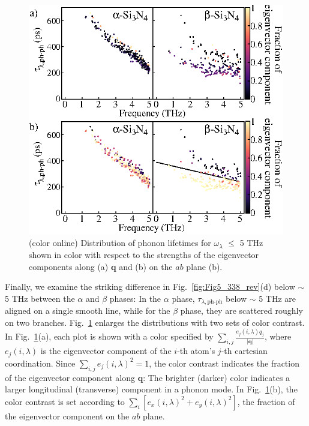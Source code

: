 \documentclass[twocolumn,amsmath,amssymb,a4paper,prb,superscriptaddress,floatfix]{revtex4-1}
\begin{document}
\begin{figure}[ht]
	 \centering
	   \includegraphics[width=\linewidth]{figure_analyze_gamma3_m1010_nolog_gray.eps} \caption{(color
		   	  online) Distribution of phonon lifetimes for $\omega_\lambda$ $\leq$ 5 THz
	  		  shown in color with respect to the strengths of the eigenvector
	  		  components along (a) $\mathbf q$ 
		  	  and (b) on the $ab$ plane (b).} \label{fig:Fig7_338} 
	   \centering
\end{figure}

Finally, we examine the striking difference in Fig.~\ref{fig:Fig5_338_rev}(d)
below $\sim$ 5 THz between the $\alpha$ and $\beta$ phases: In the $\alpha$
phase, $\tau_{\lambda,\text{ph-ph}}$ below $\sim$ 5 THz are aligned on a single
smooth line, while for the $\beta$ phase, they are scattered roughly on two
branches.  Fig.~\ref{fig:Fig7_338} enlarges the distributions with two sets of
color contrast.  In Fig.~\ref{fig:Fig7_338}(a), each plot is shown with a color
specified by $\sum_{i,j}\frac{e_j(i,\lambda)q_j}{|\mathbf q|}$, where
$e_j(i,\lambda)$ is the eigenvector component of the $i$-th atom's $j$-th
cartesian coordination. Since  $\sum_{i,j}e_j(i,\lambda)^2=1$, the color
contrast indicates the fraction of the eigenvector component along $\mathbf q$:
The brighter (darker) color indicates a larger longitudinal (transverse)
component in a phonon mode.  In Fig.~\ref{fig:Fig7_338}(b), the color contrast
is set according to $\sum_{i}[e_x(i,\lambda)^2+e_y(i,\lambda)^2]$, the fraction
of the eigenvector component on the $ab$ plane. 
\end{document}
